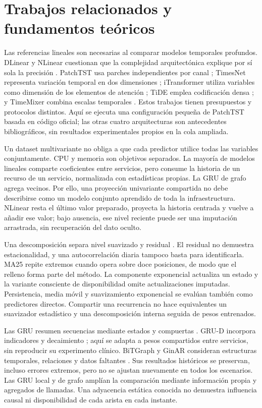 \section{Trabajos relacionados y fundamentos teóricos}
Las referencias lineales son necesarias al comparar modelos temporales profundos. DLinear y NLinear cuestionan que la complejidad arquitectónica explique por sí sola la precisión \cite{dlinear}. PatchTST usa parches independientes por canal \cite{patchtst}; TimesNet representa variación temporal en dos dimensiones \cite{timesnet}; iTransformer utiliza variables como dimensión de los elementos de atención \cite{itransformer}; TiDE emplea codificación densa \cite{tide}; y TimeMixer combina escalas temporales \cite{timemixer}. Estos trabajos tienen presupuestos y protocolos distintos. Aquí se ejecuta una configuración pequeña de PatchTST basada en código oficial; las otras cuatro arquitecturas son antecedentes bibliográficos, sin resultados experimentales propios en la cola ampliada.

Un dataset multivariante no obliga a que cada predictor utilice todas las variables conjuntamente. CPU y memoria son objetivos separados. La mayoría de modelos lineales comparte coeficientes entre servicios, pero consume la historia de un recurso de un servicio, normalizada con estadísticas propias. La GRU de grafo agrega vecinos. Por ello, una proyección univariante compartida no debe describirse como un modelo conjunto aprendido de toda la infraestructura. NLinear resta el último valor preparado, proyecta la historia centrada y vuelve a añadir ese valor; bajo ausencia, ese nivel reciente puede ser una imputación arrastrada, sin recuperación del dato oculto.

Una descomposición separa nivel suavizado y residual \cite{hyndmanfpp3}. El residual no demuestra estacionalidad, y una autocorrelación diaria tampoco basta para identificarla. MA25 repite extremos cuando opera sobre doce posiciones, de modo que el relleno forma parte del método. La componente exponencial actualiza un estado y la variante consciente de disponibilidad omite actualizaciones imputadas. Persistencia, media móvil y suavizamiento exponencial se evalúan también como predictores directos. Compartir una recurrencia no hace equivalentes un suavizador estadístico y una descomposición interna seguida de pesos entrenados.

Las GRU resumen secuencias mediante estados y compuertas \cite{gru}. GRU-D incorpora indicadores y decaimiento \cite{grud}; aquí se adapta a pesos compartidos entre servicios, sin reproducir su experimento clínico. BiTGraph y GinAR consideran estructuras temporales, relaciones y datos faltantes \cite{bitgraph,ginar}. Sus resultados históricos se preservan, incluso errores extremos, pero no se ajustan nuevamente en todos los escenarios. Las GRU local y de grafo amplían la comparación mediante información propia y agregados de llamadas. Una adyacencia estática conocida no demuestra influencia causal ni disponibilidad de cada arista en cada instante.

